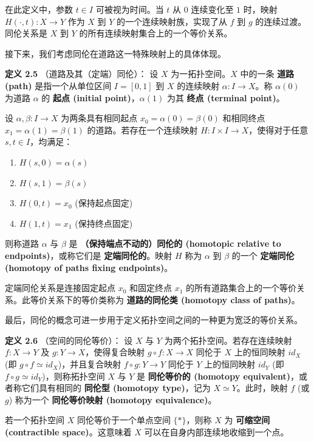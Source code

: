 在此定义中，参数 $t \in I$ 可被视为时间。当 $t$ 从 $0$ 连续变化至 $1$ 时，映射 $H(\cdot, t): X \to Y$ 作为 $X$ 到 $Y$ 的一个连续映射族，实现了从 $f$ 到 $g$ 的连续过渡。同伦关系是 $X$ 到 $Y$ 的所有连续映射集合上的一个等价关系。

接下来，我们考虑同伦在道路这一特殊映射上的具体体现。

\textbf{定义 2.5} （道路及其（定端）同伦）\cite{armstrong2013basic}：
设 $X$ 为一拓扑空间。$X$ 中的一条 \textbf{道路 (path)} 是指一个从单位区间 $I = [0,1]$ 到 $X$ 的连续映射 $\alpha: I \to X$。称 $\alpha(0)$ 为道路 $\alpha$ 的 \textbf{起点 (initial point)}，$\alpha(1)$ 为其 \textbf{终点 (terminal point)}。

设 $\alpha, \beta: I \to X$ 为两条具有相同起点 $x_0 = \alpha(0) = \beta(0)$ 和相同终点 $x_1 = \alpha(1) = \beta(1)$ 的道路。若存在一个连续映射 $H: I \times I \to X$，使得对于任意 $s, t \in I$，均满足：
\begin{enumerate}
    \item $H(s, 0) = \alpha(s)$
    \item $H(s, 1) = \beta(s)$
    \item $H(0, t) = x_0$ \quad (保持起点固定)
    \item $H(1, t) = x_1$ \quad (保持终点固定)
\end{enumerate}
则称道路 $\alpha$ 与 $\beta$ 是 \textbf{（保持端点不动的）同伦的 (homotopic relative to endpoints)}，或称它们是 \textbf{定端同伦的}。映射 $H$ 称为 $\alpha$ 到 $\beta$ 的一个 \textbf{定端同伦 (homotopy of paths fixing endpoints)}。

定端同伦关系是连接固定起点 $x_0$ 和固定终点 $x_1$ 的所有道路集合上的一个等价关系。此等价关系下的等价类称为 \textbf{道路的同伦类 (homotopy class of paths)}。

最后，同伦的概念可进一步用于定义拓扑空间之间的一种更为宽泛的等价关系。

\textbf{定义 2.6} （空间的同伦等价）\cite{armstrong2013basic}：
设 $X$ 与 $Y$ 为两个拓扑空间。若存在连续映射 $f: X \to Y$ 及 $g: Y \to X$，使得复合映射 $g \circ f: X \to X$ 同伦于 $X$ 上的恒同映射 $id_X$ (即 $g \circ f \simeq id_X$)，并且复合映射 $f \circ g: Y \to Y$ 同伦于 $Y$ 上的恒同映射 $id_Y$ (即 $f \circ g \simeq id_Y$)，则称拓扑空间 $X$ 与 $Y$ 是 \textbf{同伦等价的 (homotopy equivalent)}，或者称它们具有相同的 \textbf{同伦型 (homotopy type)}，记为 $X \simeq Y$。此时，映射 $f$ (或 $g$) 称为一个 \textbf{同伦等价映射 (homotopy equivalence)}。

若一个拓扑空间 $X$ 同伦等价于一个单点空间 $\{*\}$，则称 $X$ 为 \textbf{可缩空间 (contractible space)}。这意味着 $X$ 可以在自身内部连续地收缩到一个点。

